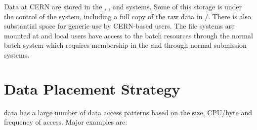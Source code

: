 \documentclass[../main-v1.tex]{subfiles}
\begin{document}
Data at CERN are stored in the , , and  systems.  Some of this storage is under the control of the  
system, including a full copy of the  raw data in /.  There is also substantial space for generic use by CERN-based users. The  file systems are mounted at  and local users have access to the  batch resources through the normal  batch system which requires membership in the   and through normal  submission systems.  

\section{Data Placement Strategy}



 data has a large number of data access patterns based on the size, CPU/byte and frequency of access.   Major examples are:
\end{document}
